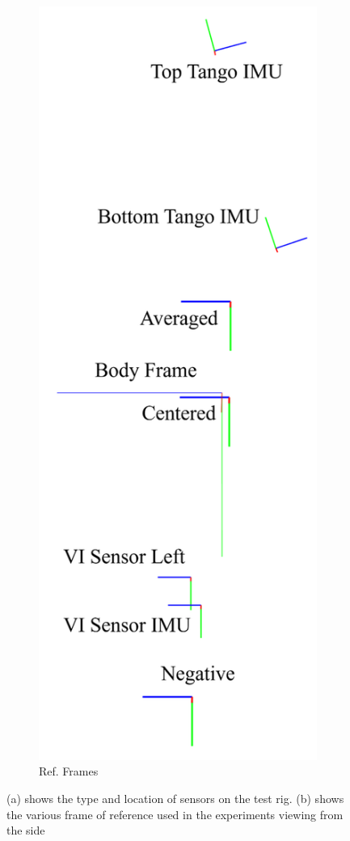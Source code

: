 \documentclass[conference]{IEEEtran}
\begin{document}
\begin{figure}[h]
\begin{subfigure}{0.12\textwidth}
\includegraphics[width = \textwidth]{figures/rig_cropped.png}
\caption{Ref. Frames}
\label{fig:rig_coordinate_frame}
\end{subfigure}
\caption{(a) shows the type and location of sensors on the test rig. (b) shows the various frame of reference used in the experiments viewing from the side}
\label{fig:combined}
\end{figure}
\end{document}

